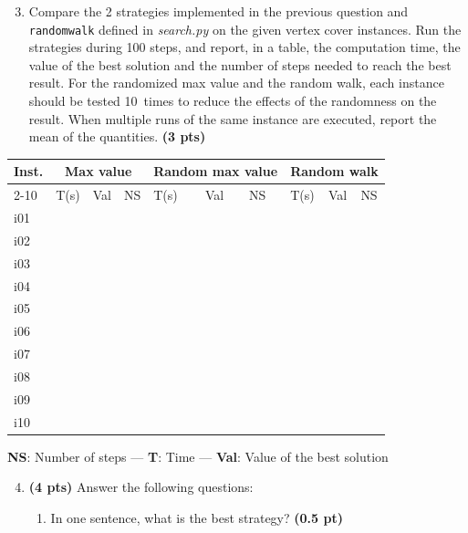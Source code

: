 \documentclass[11pt,a4paper]{report}
\begin{document}
\begin{enumerate}
\setcounter{enumi}{2}
\item Compare the 2 strategies implemented in the previous question and \texttt{randomwalk} defined in \textit{search.py} on the given vertex cover instances. 
    Run the strategies during 100 steps, and report, in a table, the computation
    time, the value of the best solution and the number of steps needed to reach the best result. For the
    randomized max value and the random walk, each instance should be tested 10~times to reduce
    the effects of the randomness on the result. When multiple runs of the same instance
    are executed, report the mean of the quantities. \textbf{(3 pts)}
\end{enumerate}

\begin{answers}[7cm]
\begin{center}
\begin{tabular}{||l||l|l|l||l|l|l||l|l|l||}
\hline
\multirow{3}{*}{Inst.} & \multicolumn{3}{c||}{Max value} & \multicolumn{3}{c||}{Random max value} & \multicolumn{3}{c||}{Random walk} \\
\cline{2-10}
\cline{2-10}
 & T(s) & Val & NS & T(s) & Val & NS & T(s) & Val & NS\\
\hline
i01 & & & & & & & & &\\
\hline
i02 & & & & & & & & &\\
\hline
i03 & & & & & & & & &\\
\hline
i04 & & & & & & & & &\\
\hline
i05 & & & & & & & & &\\
\hline
i06 & & & & & & & & &\\
\hline
i07 & & & & & & & & &\\
\hline
i08 & & & & & & & & &\\
\hline
i09 & & & & & & & & &\\
\hline
i10 & & & & & & & & &\\
\hline
\end{tabular}
\end{center}
\textbf{NS}: Number of steps — \textbf{T}: Time — \textbf{Val}: Value of the best solution
\end{answers}



\begin{enumerate}
\setcounter{enumi}{3}
    \item \textbf{(4 pts)} Answer the following questions:
    \begin{enumerate}
        \item In one sentence, what is the best strategy? \textbf{(0.5 pt)}
    \end{enumerate}
\end{enumerate}
\end{document}
